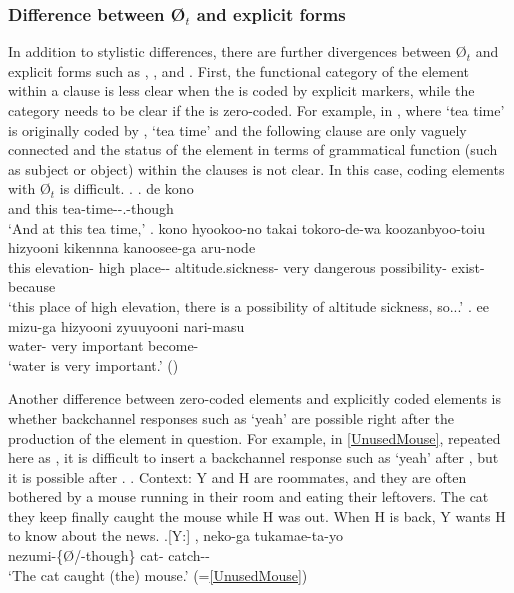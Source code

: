 \subsubsection{Difference between {\O$_{t}$} and explicit forms}

In addition to stylistic differences,
there are further divergences between {\O$_{t}$} and explicit forms such as , , and .
First,
the functional category of the  element within a clause is less clear when the  is coded by explicit markers,
while the category needs to be clear
if the  is zero-coded.
For example, in \Next,
where  `tea time' is originally coded by ,
`tea time' and the following clause are only vaguely connected
and the status of the  element in terms of grammatical function (such as subject or object) within the clauses is not clear.
In this case, coding elements with {\O$_{t}$} is difficult.
%
\ex. \ag. de kono  \\
		and this tea-time--.-though \\
		`And at this tea time,'
	\bg. kono hyookoo-no {takai} {tokoro-de-wa} koozanbyoo-toiu hizyooni {kikennna} {kanoosee-ga} aru-node \\
		this elevation- high place-- altitude.sickness- very dangerous possibility- exist-because \\
		`this place of high elevation, there is a possibility of altitude sickness, so...'
	\bg. ee {mizu-ga} hizyooni zyuuyooni nari-masu \\
		 water- very important become- \\
		`water is very important.'
		 \hfill{()}



Another difference between zero-coded elements and explicitly coded elements is whether backchannel responses such as  `yeah' are possible right after the production of the  element in question.
For example, in \ref{UnusedMouse}, repeated here as \Next,
it is difficult to insert a backchannel response such as  `yeah' after ,
but it is possible after .
%
\ex. Context: Y and H are roommates, and they are often bothered by a mouse running in their room
		and eating their leftovers.
		The cat they keep finally caught the mouse while H was out.
		When H is back, Y wants H to know about the news.
	\ag.[Y:] , neko-ga tukamae-ta-yo \\
		nezumi-\{{\O}/-though\} cat- catch-- \\
		`The cat caught (the) mouse.' \hfill{(=\ref{UnusedMouse})}

